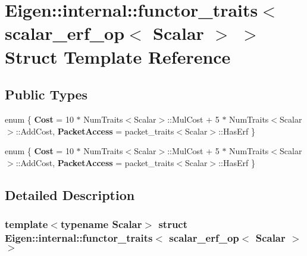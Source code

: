 \hypertarget{struct_eigen_1_1internal_1_1functor__traits_3_01scalar__erf__op_3_01_scalar_01_4_01_4}{}\section{Eigen\+:\+:internal\+:\+:functor\+\_\+traits$<$ scalar\+\_\+erf\+\_\+op$<$ Scalar $>$ $>$ Struct Template Reference}
\label{struct_eigen_1_1internal_1_1functor__traits_3_01scalar__erf__op_3_01_scalar_01_4_01_4}
\subsection*{Public Types}
\begin{DoxyCompactItemize}
\item 
\mbox{\label{struct_eigen_1_1internal_1_1functor__traits_3_01scalar__erf__op_3_01_scalar_01_4_01_4_ad3aee2a7aeeacd69215201c9afa88626}} 
enum \{ {\bfseries Cost} = 10 $\ast$ Num\+Traits$<$Scalar$>$\+:\+:Mul\+Cost + 5 $\ast$ Num\+Traits$<$Scalar$>$\+:\+:Add\+Cost, 
{\bfseries Packet\+Access} = packet\+\_\+traits$<$Scalar$>$\+:\+:Has\+Erf
 \}
\item 
\mbox{\label{struct_eigen_1_1internal_1_1functor__traits_3_01scalar__erf__op_3_01_scalar_01_4_01_4_a433730fc29a3cece99e0580eeaac61f7}} 
enum \{ {\bfseries Cost} = 10 $\ast$ Num\+Traits$<$Scalar$>$\+:\+:Mul\+Cost + 5 $\ast$ Num\+Traits$<$Scalar$>$\+:\+:Add\+Cost, 
{\bfseries Packet\+Access} = packet\+\_\+traits$<$Scalar$>$\+:\+:Has\+Erf
 \}
\end{DoxyCompactItemize}


\subsection{Detailed Description}
\subsubsection*{template$<$typename Scalar$>$\newline
struct Eigen\+::internal\+::functor\+\_\+traits$<$ scalar\+\_\+erf\+\_\+op$<$ Scalar $>$ $>$}



